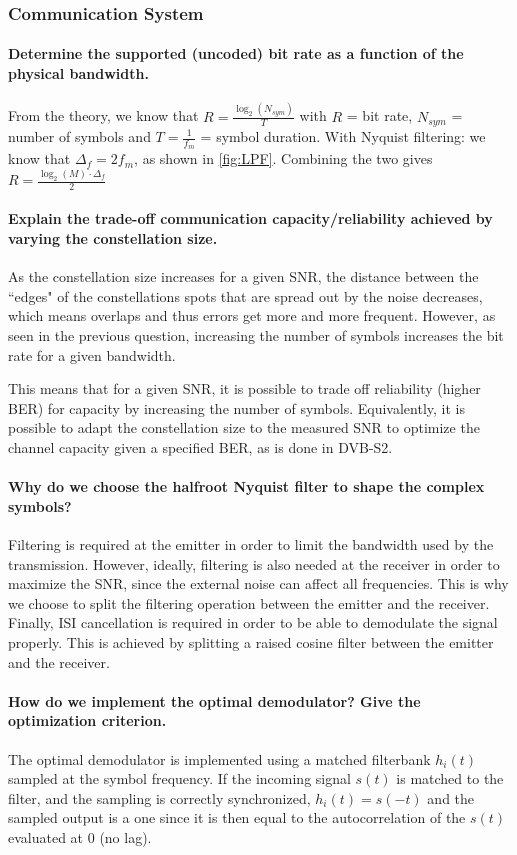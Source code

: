 \subsubsection{Communication System}
\paragraph{Determine the supported (uncoded) bit rate as a function of the physical bandwidth.} From the theory, we know that $R = \frac{\log_2(N_{sym})}{T}$ with $R$ = bit rate, $N_{sym}$ = number of symbols and $T = \frac{1}{f_m}$ = symbol duration.
With Nyquist filtering: we know that $\Delta_f = 2f_m$, as shown in \ref{fig:LPF}.
Combining the two gives $R = \frac{\log_2(M)\cdot\Delta_f}{2}$

\paragraph{Explain the trade-off communication capacity/reliability achieved by varying the constellation size.}
As the constellation size increases for a given SNR, the distance between the ``edges" of the constellations spots that are spread out by the noise decreases, which means overlaps and thus errors get more and more frequent.
However, as seen in the previous question, increasing the number of symbols increases the bit rate for a given bandwidth.

This means that for a given SNR, it is possible to trade off reliability (higher BER) for capacity by increasing the number of symbols. Equivalently, it is possible to adapt the constellation size to the measured SNR to optimize the channel capacity given a specified BER, as is done in DVB-S2.

\paragraph{Why do we choose the halfroot Nyquist filter to shape the complex symbols?}
Filtering is required at the emitter in order to limit the bandwidth used by the transmission.
However, ideally, filtering is also needed at the receiver in order to maximize the SNR, since the external noise can affect all frequencies.
This is why we choose to split the filtering operation between the emitter and the receiver.
Finally, ISI cancellation is required in order to be able to demodulate the signal properly.
This is achieved by splitting a raised cosine filter between the emitter and the receiver.

\paragraph{How do we implement the optimal demodulator? Give the optimization criterion.}
The optimal demodulator is implemented using a matched filterbank $h_i(t)$ sampled at the symbol frequency. If the incoming signal $s(t)$ is matched to the filter, and the sampling is correctly synchronized,  $h_i(t) = s(-t)$ and the sampled output is a one since it is then equal to the autocorrelation of the $s(t)$ evaluated at $0$ (no lag).

